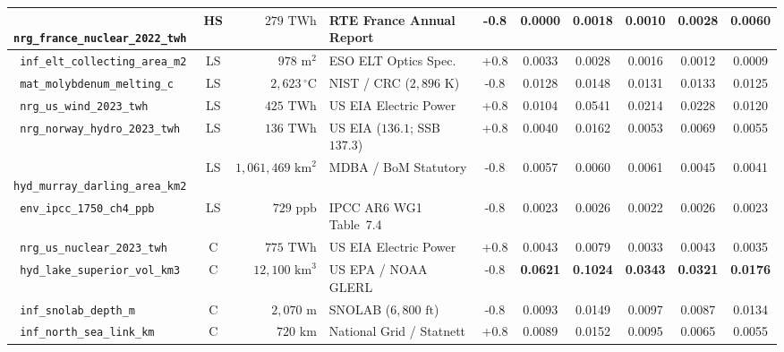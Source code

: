 \documentclass[11pt,letterpaper]{article}
\theoremstyle{plain}
\newcommand{\taskid}[1]{\texttt{\small\hyphenpenalty=50 #1}}
\begin{document}
\begin{table}[t]
\begin{tabular}{@{}l c r l S[table-format=-1.1] S[table-format=1.4] S[table-format=1.4] S[table-format=1.4] S[table-format=1.4] S[table-format=1.4]@{}}
\taskid{nrg\_france\_nuclear\_2022\_twh} & HS & $279\text{ TWh}$ & RTE France Annual Report & -0.8 & 0.0000 & 0.0018 & 0.0010 & 0.0028 & 0.0060 \\
\midrule
\taskid{inf\_elt\_collecting\_area\_m2} & LS & $978\text{ m}^2$ & ESO ELT Optics Spec.\ & +0.8 & 0.0033 & 0.0028 & 0.0016 & 0.0012 & 0.0009 \\
\taskid{mat\_molybdenum\_melting\_c} & LS & $2{,}623\,^\circ\text{C}$ & NIST / CRC ($2{,}896\text{ K}$) & -0.8 & 0.0128 & 0.0148 & 0.0131 & 0.0133 & 0.0125 \\
\taskid{nrg\_us\_wind\_2023\_twh} & LS & $425\text{ TWh}$ & US EIA Electric Power & +0.8 & 0.0104 & 0.0541 & 0.0214 & 0.0228 & 0.0120 \\
\taskid{nrg\_norway\_hydro\_2023\_twh} & LS & $136\text{ TWh}$ & US EIA ($136.1$; SSB $137.3$) & +0.8 & 0.0040 & 0.0162 & 0.0053 & 0.0069 & 0.0055 \\
\taskid{hyd\_murray\_darling\_area\_km2} & LS & $1{,}061{,}469\text{ km}^2$ & MDBA / BoM Statutory & -0.8 & 0.0057 & 0.0060 & 0.0061 & 0.0045 & 0.0041 \\
\taskid{env\_ipcc\_1750\_ch4\_ppb} & LS & $729\text{ ppb}$ & IPCC AR6 WG1 Table~7.4 & -0.8 & 0.0023 & 0.0026 & 0.0022 & 0.0026 & 0.0023 \\
\midrule
\taskid{nrg\_us\_nuclear\_2023\_twh} & C & $775\text{ TWh}$ & US EIA Electric Power & +0.8 & 0.0043 & 0.0079 & 0.0033 & 0.0043 & 0.0035 \\
\taskid{hyd\_lake\_superior\_vol\_km3} & C & $12{,}100\text{ km}^3$ & US EPA / NOAA GLERL & -0.8 & \bfseries 0.0621 & \bfseries 0.1024 & \bfseries 0.0343 & \bfseries 0.0321 & \bfseries 0.0176 \\
\taskid{inf\_snolab\_depth\_m} & C & $2{,}070\text{ m}$ & SNOLAB ($6{,}800\text{ ft}$) & -0.8 & 0.0093 & 0.0149 & 0.0097 & 0.0087 & 0.0134 \\
\taskid{inf\_north\_sea\_link\_km} & C & $720\text{ km}$ & National Grid / Statnett & +0.8 & 0.0089 & 0.0152 & 0.0095 & 0.0065 & 0.0055 \\
\bottomrule
\end{tabular}
\end{table}
\end{document}
